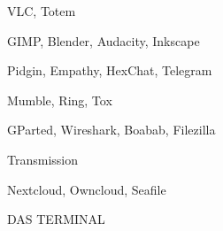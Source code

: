 \begin{frame}[allowframebreaks]
\begin{description}[style=nextline]
 \item  [Videos] VLC, Totem
 \item  [Medien] GIMP, Blender, Audacity, Inkscape
 \item  [Messenger] Pidgin, Empathy, HexChat, Telegram
 \item  [VoIP] Mumble, Ring, Tox
 \item  [System] GParted, Wireshark, Boabab, Filezilla
 \item  [  Torrents] Transmission 
 \item  [Synchronisation] Nextcloud, Owncloud, Seafile
 \item   [alles] DAS TERMINAL 
\end{description}
 \end{frame}




